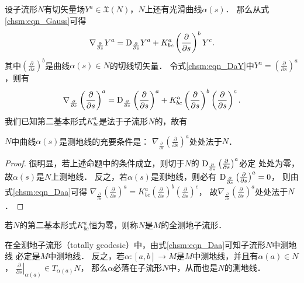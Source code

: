 设子流形$N$有切矢量场$Y^a \in \mathfrak{X}(N)$，$N$上还有光滑曲线$\alpha(s)$．
那么从式\eqref{chsm:eqn_Gauss}可得
\begin{equation}\label{chsm:eqn_DaY}
    \nabla_{\frac{\partial}{\partial s}} Y^a = {\rm D}_{\frac{\partial}{\partial s}} Y^a
     + K^a_{bc} \left(\frac{\partial}{\partial s}\right)^b Y^c .
\end{equation}
其中$\left(\frac{\partial}{\partial s}\right)^b$是曲线$\alpha(s)\in N$的切线切矢量．
令式\eqref{chsm:eqn_DaY}中$Y^a=\left(\frac{\partial}{\partial s}\right)^a$，则有
\begin{equation}\label{chsm:eqn_Daa}
    \nabla_{\frac{\partial}{\partial s}} \left(\frac{\partial}{\partial s}\right)^a
     = {\rm D}_{\frac{\partial}{\partial s}} \left(\frac{\partial}{\partial s}\right)^a
    + K^a_{bc} \left(\frac{\partial}{\partial s}\right)^b \left(\frac{\partial}{\partial s}\right)^c .
\end{equation}
我们已知第二基本形式$K^a_{bc}$是法于子流形$N$的，故有
\begin{proposition}\label{chsm:thm_sub-Geodesic}
    $N$中曲线$\alpha(s)$是测地线的充要条件是：
    $\nabla_{\frac{\partial}{\partial s}} \left(\frac{\partial}{\partial s}\right)^a$处处法于$N$．
\end{proposition}
\begin{proof}
很明显，若上述命题中的条件成立，则切于$N$的
${\rm D}_{\frac{\partial}{\partial s}} \left(\frac{\partial}{\partial s}\right)^a$必定
处处为零，故$\alpha(s)$是$N$上测地线．
反之，若$\alpha(s)$是测地线，则必有
${\rm D}_{\frac{\partial}{\partial s}} \left(\frac{\partial}{\partial s}\right)^a=0$，
则由式\eqref{chsm:eqn_Daa}可得 $\nabla_{\frac{\partial}{\partial s}} \left(\frac{\partial}{\partial s}\right)^a
= K^a_{bc} \left(\frac{\partial}{\partial s}\right)^b \left(\frac{\partial}{\partial s}\right)^c $，
故$\nabla_{\frac{\partial}{\partial s}} \left(\frac{\partial}{\partial s}\right)^a$处处法于$N$．
\end{proof}



\begin{definition}\label{chsm:def_total-geodesic}
    若$N$的第二基本形式$K^a_{bc}$恒为零，则称$N$是$M$的{\heiti 全测地子流形}．
\end{definition}

在全测地子流形（totally geodesic）中，由式\eqref{chsm:eqn_Daa}可知子流形$N$中测地线
必定是$M$中测地线．
反之，若$\alpha:[a,b]\to M$是$M$中测地线，并且有$\alpha(a)\in N$，
$\left. \frac{\partial}{\partial s}\right|_{\alpha(a)} \in T_{\alpha(a)}N$，
那么$\alpha$必落在子流形$N$中，从而也是$N$的测地线．




